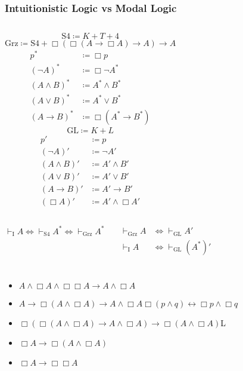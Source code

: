 \documentclass[UTF8,11pt,colorlinks,compress,openany]{beamer}%
\begin{document}
\begin{frame}\frametitle{Intuitionistic Logic vs Modal Logic}
\setlength\abovedisplayskip{0pt}
	\begin{columns}
			\[\mathrm{S4}\coloneqq K+T+4\]
			\[\mathrm{Grz}\coloneqq \mathrm{S4}+\Box(\Box(A\to\Box A)\to A)\to A\]
			\begin{align*}
			p^*&\coloneqq \Box p\\
			(\neg A)^*&\coloneqq \Box\neg A^*\\
			(A\wedge B)^*&\coloneqq A^*\wedge B^*\\
			(A\vee B)^*&\coloneqq A^*\vee B^*\\
			(A\to B)^*&\coloneqq \Box(A^*\to B^*)
			\end{align*}
			\[\mathrm{GL}\coloneqq K+L\]
			\begin{align*}
			p'&\coloneqq p\\
			(\neg A)'&\coloneqq \neg A'\\
			(A\wedge B)'&\coloneqq A'\wedge B'\\
			(A\vee B)'&\coloneqq A'\vee B'\\
			(A\to B)'&\coloneqq A'\to B'\\
			(\Box A)'&\coloneqq A'\wedge\Box A'
			\end{align*}
	\end{columns}
	\begin{columns}
		\column{.5\textwidth}
			\begin{block}{}
				\[\vdash_{\mathrm{I}} A\iff\vdash_{\mathrm{S4}} A^*\iff\vdash_{\mathrm{Grz}} A^*\]
			\end{block}
		\column{.4\textwidth}
			\begin{block}{}
				\begin{align*}
				\vdash_{\mathrm{Grz}} A&\iff\vdash_{\mathrm{GL}} A'\\
				\vdash_{\mathrm{I}} A&\iff\vdash_{\mathrm{GL}}(A^*)'
				\end{align*}
			\end{block}
	\end{columns}
\end{frame}

\begin{frame}\frametitle{}
\centerline{}
\begin{itemize}
	\item $A\wedge\Box A\wedge\Box\Box A\to A\wedge\Box A$
	\item $A\to\Box(A\wedge\Box A)\to A\wedge\Box A$\hfill $\Box(p\wedge q)\leftrightarrow\Box p\wedge\Box q$
	\item $\Box(\Box (A\wedge\Box A)\to A\wedge\Box A)\to\Box(A\wedge\Box A)$\hfill L
	\item $\Box A\to\Box(A\wedge\Box A)$
	\item $\Box A\to\Box\Box A$
\end{itemize}
\end{frame}
\end{document}
